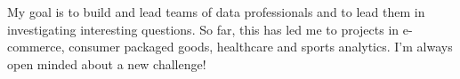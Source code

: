 \begin {cvsummary}

My goal is to build and lead teams of data professionals and to lead them in investigating interesting questions. So far, this has led me to projects in e-commerce, consumer packaged goods, healthcare and sports analytics. I'm always open minded about a new challenge!

\end {cvsummary}
